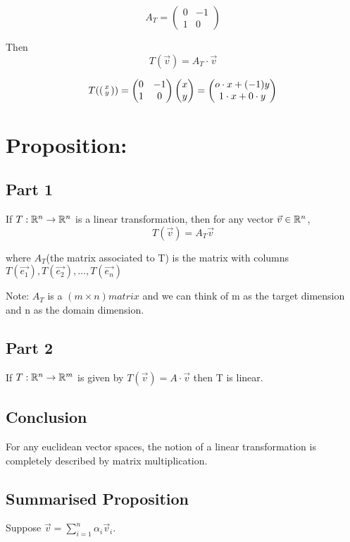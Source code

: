 \documentclass[a4paper]{article}
\begin{document}
\[A_T = 
	\begin{pmatrix}
		0&-1\\1&0
	\end{pmatrix}
\]

Then 
\[T(\vec{v}) = A_T \cdot \vec{v}\]

\[
	T(\left(\begin{smallmatrix} x\\y \end{smallmatrix} \right)) = 
	\begin{pmatrix}
		0&-1\\1&0
	\end{pmatrix}
	\begin{pmatrix}
		x\\y
	\end{pmatrix} =
	\begin{pmatrix}
		o\cdot x + (-1)y \\
		1\cdot x + 0\cdot y
	\end{pmatrix}
\]

\section*{Proposition:}
\subsection*{Part 1}
If $T: \mathbb{R}^n \to \mathbb{R}^n$ is a linear transformation, then for any vector $\vec{v} \in \mathbb{R}^n$, 
\[T(\vec{v}) = A_T \vec{v}\]

where $A_T$(the matrix associated to T) is the matrix with columns $T(\vec{e_1}), T(\vec{e_2}), \dots, T(\vec{e_n})$

Note: $A_T$ is a $(m \times n) matrix$ and we can think of m as the target dimension and n as the domain dimension. 

\subsection*{Part 2}

If $T: \mathbb{R}^n \to \mathbb{R}^m$ is given by $T(\vec{v}) = A \cdot \vec{v}$ then T is linear. 

\subsection*{Conclusion}

For any euclidean vector spaces, the notion of a linear transformation is completely described by matrix multiplication.

\subsection*{Summarised Proposition}
Suppose $\vec{v} = \sum_{i=1}^{n}\alpha_i \vec{v}_i$.
\end{document}
